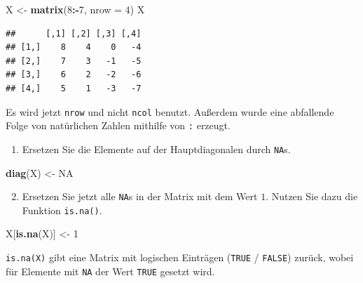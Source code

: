 \documentclass[12pt,a4paper]{article}
\newenvironment{Shaded}{\begin{snugshade}}{\end{snugshade}}
\newcommand{\AttributeTok}[1]{\textcolor[rgb]{0.13,0.29,0.53}{#1}}
\newcommand{\ConstantTok}[1]{\textcolor[rgb]{0.56,0.35,0.01}{#1}}
\newcommand{\DecValTok}[1]{\textcolor[rgb]{0.00,0.00,0.81}{#1}}
\newcommand{\FunctionTok}[1]{\textcolor[rgb]{0.13,0.29,0.53}{\textbf{#1}}}
\newcommand{\NormalTok}[1]{#1}
\newcommand{\OtherTok}[1]{\textcolor[rgb]{0.56,0.35,0.01}{#1}}
\newcommand{\SpecialCharTok}[1]{\textcolor[rgb]{0.81,0.36,0.00}{\textbf{#1}}}
\begin{document}
\begin{Shaded}
\begin{Highlighting}[]
\NormalTok{    X }\OtherTok{\textless{}{-}} \FunctionTok{matrix}\NormalTok{(}\DecValTok{8}\SpecialCharTok{:{-}}\DecValTok{7}\NormalTok{, }\AttributeTok{nrow =} \DecValTok{4}\NormalTok{)}
\NormalTok{    X}
\end{Highlighting}
\end{Shaded}

\begin{verbatim}
##      [,1] [,2] [,3] [,4]
## [1,]    8    4    0   -4
## [2,]    7    3   -1   -5
## [3,]    6    2   -2   -6
## [4,]    5    1   -3   -7
\end{verbatim}

Es wird jetzt \texttt{nrow} und nicht \texttt{ncol} benutzt. Außerdem
wurde eine abfallende Folge von natürlichen Zahlen mithilfe von
\texttt{:} erzeugt.

\begin{enumerate} 
  \item Ersetzen Sie die Elemente auf der Hauptdiagonalen durch \texttt{NA}s. 
\end{enumerate}

\begin{Shaded}
\begin{Highlighting}[]
    \FunctionTok{diag}\NormalTok{(X) }\OtherTok{\textless{}{-}} \ConstantTok{NA}
\end{Highlighting}
\end{Shaded}

\begin{enumerate} \setcounter{enumi}{1}
  \item Ersetzen Sie jetzt alle \texttt{NA}s in der Matrix mit dem Wert $1$. Nutzen Sie dazu die Funktion \texttt{is.na()}.
\end{enumerate}

\begin{Shaded}
\begin{Highlighting}[]
\NormalTok{    X[}\FunctionTok{is.na}\NormalTok{(X)] }\OtherTok{\textless{}{-}} \DecValTok{1}
\end{Highlighting}
\end{Shaded}

\texttt{is.na(X)} gibt eine Matrix mit logischen Einträgen
(\texttt{TRUE} / \texttt{FALSE}) zurück, wobei für Elemente mit
\texttt{NA} der Wert \texttt{TRUE} gesetzt wird.
\end{document}
